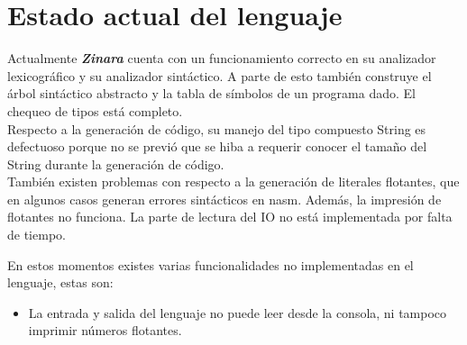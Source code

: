 \documentclass[12pt, spanish]{report}
\begin{document}
\chapter{Estado actual del lenguaje}
\label{chap:estado}

Actualmente \emph{\textbf{Zinara}} cuenta con un funcionamiento
correcto en su analizador lexicogr\'afico y su analizador sint\'actico. A
parte de esto tambi\'en construye el \'arbol sint\'actico abstracto y la
tabla de s\'imbolos de un programa dado. El chequeo de tipos est\'a completo.\\

\indent Respecto a la generaci\'on de c\'odigo, su manejo del tipo
compuesto String es defectuoso porque no se previ\'o que se hiba a
requerir conocer el tama\~no del String durante la generaci\'on de
c\'odigo.\\
\indent Tambi\'en existen problemas con respecto a la generaci\'on de
literales flotantes, que en algunos casos generan errores sint\'acticos
en nasm. Adem\'as, la impresi\'on de flotantes no funciona.
\indent La parte de lectura del IO no est\'a implementada por falta de
tiempo.


\indent En estos momentos existes varias funcionalidades no
implementadas en el lenguaje, estas son:
\begin{itemize}
\item La entrada y salida del lenguaje no puede leer desde la consola,
  ni tampoco imprimir números flotantes.
\end{itemize}



\end{document}
